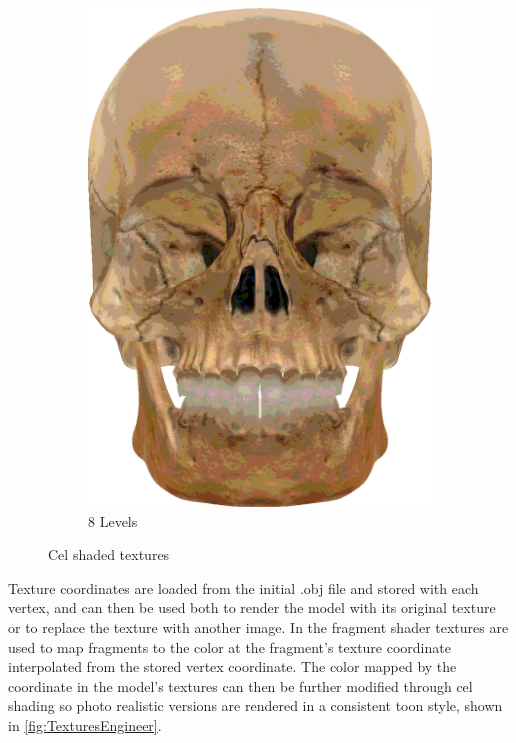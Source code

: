 \begin{figure}[h]
\begin{subfigure}[b]{0.16\textwidth}
        \includegraphics[width=\textwidth]{img/textures/CelShadeTexture8Skull.png}
        \caption{8 Levels}
        \label{fig:CelShadeTexture8Skull}
    \end{subfigure}
    \caption{Cel shaded textures}
    \label{fig:TexturesEngineer}
\end{figure}

Texture coordinates are loaded from the initial .obj file and stored with each vertex, and can then be used 
both to render the model with its original texture or to replace the texture with another image. In the fragment 
shader textures are used to map fragments to the color at the fragment's texture coordinate interpolated from the 
stored vertex coordinate. The color mapped by the coordinate in the model's textures can then be further modified 
through cel shading so photo realistic versions are rendered in a consistent toon style, shown in \autoref{fig:TexturesEngineer}.

